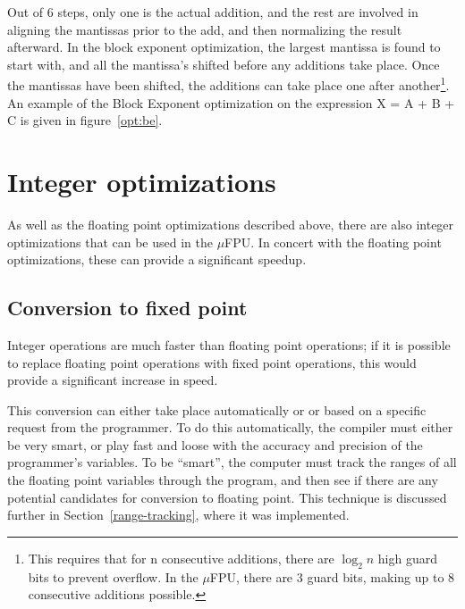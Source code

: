Out of 6 steps, only one is the actual addition, and the rest are involved
in aligning the mantissas prior to the add, and then normalizing the result
afterward.  In the block exponent optimization, the largest mantissa is
found to start with, and all the mantissa's shifted before any additions
take place.  Once the mantissas have been shifted, the additions can take
place one after another\footnote{This requires that for n consecutive
additions, there are $\log_{2}n$ high guard bits to prevent overflow.  In
the $\mu$FPU, there are 3 guard bits, making up to 8 consecutive additions
possible.}.  An example of the Block Exponent optimization on the expression
X = A + B + C is given in figure~\ref{opt:be}.

%

\section{Integer optimizations}

As well as the floating point optimizations described above, there are
also integer optimizations that can be used in the $\mu$FPU\@.  In concert
with the floating point optimizations, these can provide a significant
speedup.  

\subsection{Conversion to fixed point}

Integer operations are much faster than floating point operations; if it is
possible to replace floating point operations with fixed point operations,
this would provide a significant increase in speed.

This conversion can either take place automatically or or based on a
specific request from the programmer.  To do this automatically, the
compiler must either be very smart, or play fast and loose with the accuracy
and precision of the programmer's variables.  To be ``smart'', the computer
must track the ranges of all the floating point variables through the
program, and then see if there are any potential candidates for conversion
to floating point.  This technique is discussed further in
Section~\ref{range-tracking}, where it was implemented.

